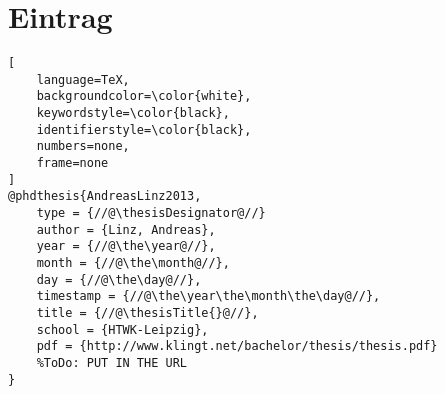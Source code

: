 \chapter*{\BibTeX{} Eintrag}

\begin{lstlisting}[
	language=TeX,
	backgroundcolor=\color{white},
	keywordstyle=\color{black},
	identifierstyle=\color{black},
	numbers=none,
	frame=none
]
@phdthesis{AndreasLinz2013,
	type = {//@\thesisDesignator@//}
	author = {Linz, Andreas},
	year = {//@\the\year@//},
	month = {//@\the\month@//},
	day = {//@\the\day@//},
	timestamp = {//@\the\year\the\month\the\day@//},
	title = {//@\thesisTitle{}@//},
	school = {HTWK-Leipzig},
	pdf = {http://www.klingt.net/bachelor/thesis/thesis.pdf}
	%ToDo: PUT IN THE URL
}
\end{lstlisting}
